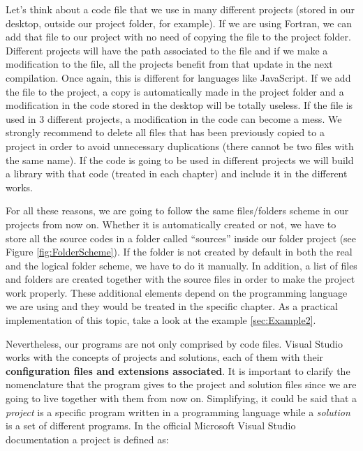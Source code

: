 Let's think about a code file that we use in many different projects (stored in our desktop, outside our project folder, for example). If we are using Fortran, we can add that file to our project with no need of copying the file to the project folder. Different projects will have the path associated to the file and if we make a modification to the file, all the projects benefit from that update in the next compilation. Once again, this is different for languages like JavaScript. If we add the file to the project, a copy is automatically made in the project folder and a modification in the code stored in the desktop will be totally useless. If the file is used in 3 different projects, a modification in the code can become a mess. We strongly recommend to delete all files that has been previously copied to a project in order to avoid unnecessary duplications (there cannot be two files with the same name). If the code is going to be used in different projects we will build a library with that code (treated in each chapter) and include it in the different works.

\begin{IN}
    For all these reasons, we are going to follow the same files/folders scheme in our projects from now on. Whether it is automatically created or not, we have to store all the source codes in a folder called ``sources'' inside our folder project (see Figure \ref{fig:FolderScheme}). If the folder is not created by default in both the real and the logical folder scheme, we have to do it manually. In addition, a list of files and folders are created together with the source files in order to make the project work properly. These additional elements depend on the programming language we are using and they would be treated in the specific chapter. As a practical implementation of this topic, take a look at the example \ref{sec:Example2}.
\end{IN}

Nevertheless, our programs are not only comprised by code files. Visual Studio works with the concepts of projects and solutions, each of them with their \textbf{configuration files and extensions associated}. It is important to clarify the nomenclature that the program gives to the project and solution files since we are going to live together with them from now on. Simplifying, it could be said that a \textit{project} is a specific program written in a programming language while a \textit{solution} is a set of different programs. In the official Microsoft Visual Studio documentation a project is defined as:

